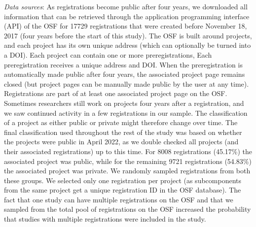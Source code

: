 \documentclass[
  ,man, a4paper,floatsintext]{apa6}
\begin{document}
\emph{Data sources}: As registrations become public after four years, we downloaded all information that can be retrieved through the application programming interface (API) of the OSF for 17729 registrations that were created before November 18, 2017 (four years before the start of this study). The OSF is built around projects, and each project has its own unique address (which can optionally be turned into a DOI). Each project can contain one or more preregistrations, Each preregistration receives a unique address and DOI. When the preregistration is automatically made public after four years, the associated project page remains closed (but project pages can be manually made public by the user at any time). Registrations are part of at least one associated project page on the OSF. Sometimes researchers still work on projects four years after a registration, and we saw continued activity in a few registrations in our sample. The classification of a project as either public or private might therefore change over time. The final classification used throughout the rest of the study was based on whether the projects were public in April 2022, as we double checked all projects (and their associated registrations) up to this time. For 8008 registrations (45.17\%) the associated project was public, while for the remaining 9721 registrations (54.83\%) the associated project was private. We randomly sampled registrations from both these groups. We selected only one registration per project (as subcomponents from the same project get a unique registration ID in the OSF database). The fact that one study can have multiple registrations on the OSF and that we sampled from the total pool of registrations on the OSF increased the probability that studies with multiple registrations were included in the study.
\end{document}
